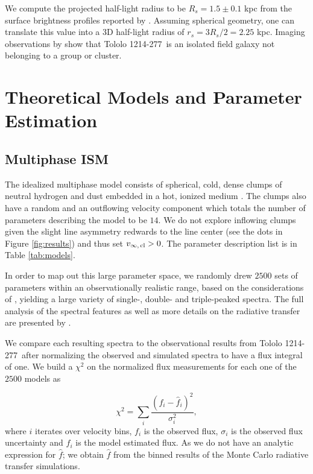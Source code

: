 \documentclass[a4paper,fleqn,usenatbib]{mnras}
\newcommand{\tol}{Tololo 1214-277}
\begin{document}
We compute the projected half-light radius to be $R_s=1.5\pm0.1$ kpc 
from the surface brightness profiles reported by \cite{2003A&A...410..481N}. 
Assuming spherical geometry, one can translate this value into a 3D
half-light radius of $r_s=3R_s/2=2.25$ kpc.
Imaging observations by \cite{2001AJ....121..169F} show that \tol\ is
an isolated field galaxy not belonging to a group or cluster. 






\section{Theoretical Models and Parameter Estimation}


\subsection{Multiphase ISM} 

The idealized multiphase model consists of spherical, cold, dense
clumps of neutral hydrogen and dust embedded in a hot, ionized
medium \citep{Gronke2016}. 
The clumps also have a random and an outflowing velocity
component which totals the number of parameters describing the model
to be $14$.
We do not explore inflowing clumps given the slight line asymmetry
redwards to the line center (see the dots in Figure \ref{fig:results})
and thus set $v_{\infty,\,{\rm cl}}>0$.
The parameter description list is in Table \ref{tab:models}.


In order to map out this large parameter space, we randomly drew
$2500$ sets of parameters within an observationally realistic range,
based on the considerations of \citet{Laursen2013ApJ...766..124L}, 
yielding a large variety of single-, double- and triple-peaked
spectra. 
The full analysis of the spectral features as well as
more details on the radiative transfer are presented by
\citet{Gronke2016}.    

We compare each resulting spectra to the observational results from
\tol\ after normalizing the observed and simulated spectra to have a 
flux integral of one.
We build a $\chi^2$ on the normalized flux measurements for each one
of the $2500$ models as

\begin{equation}
\chi^2 = \sum_{i} \frac{({f}_i - \hat{f}_i)^2}{\sigma_i^2}, 
\label{eq:chi2}
\end{equation}
%
where $i$ iterates over velocity bins, $f_{i}$ is the observed flux,
$\sigma_i$ is the observed flux uncertainty and $\hat{f}_i$ is the
model estimated flux.
As we do not have an analytic expression for $\hat{f}$;
we obtain $\hat{f}$ from the binned results of the Monte Carlo radiative transfer simulations.
\end{document}
